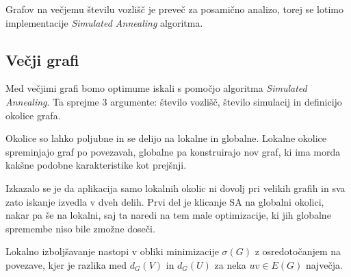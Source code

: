 \documentclass[ letterpaper, titlepage, fleqn]{article}
\begin{document}
Grafov na večjemu številu vozlišč je preveč za posamično analizo, torej
se lotimo implementacije {\em Simulated Annealing} algoritma.

\subsection{Večji grafi}

Med večjimi grafi bomo optimume iskali s pomočjo algoritma
{\em Simulated Annealing}. Ta sprejme 3 argumente: število vozlišč, število simulacij
in definicijo okolice grafa.

Okolice so lahko poljubne in se delijo na lokalne in globalne.
Lokalne okolice spreminjajo graf po povezavah, globalne pa
konstruirajo nov graf, ki ima morda kakšne podobne karakteristike kot prejšnji.

Izkazalo se je da aplikacija samo lokalnih okolic ni dovolj pri velikih grafih in sva zato
iskanje izvedla v dveh delih. Prvi del je klicanje SA na globalni okolici, nakar
pa še na lokalni, saj ta naredi na tem male optimizacije, ki jih globalne spremembe 
niso bile zmožne doseči.

Lokalno izboljšavanje nastopi v obliki minimizacije $\sigma(G)$ z osredotočanjem na
povezave, kjer je razlika med $d_G(V)$ in $d_G(U)$ za neka $uv \in E(G)$ največja.
\end{document}
